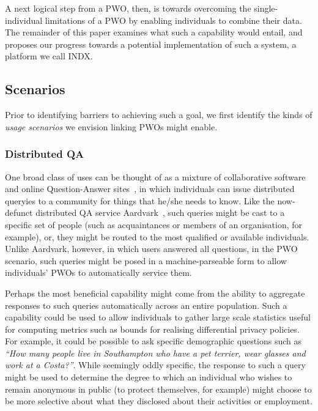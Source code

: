 \documentclass{acm_proc_article-sp}
\begin{document}
A next logical step from a PWO, then, is towards overcoming the single-individual limitations of a PWO by enabling individuals to combine their data.  The remainder of this paper examines what such a capability would entail, and proposes our progress towards a potential implementation of such a system, a platform we call INDX. 

\subsection{Scenarios}

Prior to identifying barriers to achieving such a goal, we first identify the kinds of \emph{usage scenarios} we envision linking PWOs might enable.  

\subsubsection{Distributed QA}

One broad class of uses can be thought of as a mixture of collaborative software and online Question-Answer sites~\cite{harper2009facts}, in which individuals can issue distributed queryies to a community for things that he/she needs to know.  Like the now-defunct distributed QA service Aardvark~\cite{horowitz2010anatomy}, such queries might be cast to a specific set of people (such as acquaintances or members of an organisation, for example), or, they might be routed to the most qualified or available individuals.  Unlike Aardvark, however, in which users answered all questions, in the PWO scenario, such queries might be posed in a machine-parseable form to allow individuals' PWOs to automatically service them.

Perhaps the most beneficial capability might come from the ability to aggregate responses to such queries automatically across an entire population.  Such a capability could be used to allow individuals to gather large scale statistics useful for computing metrics such as bounds for realising differential privacy \cite{dwork2006differential} policies.  For example, it could be possible to ask specific demographic questions such as \emph{``How many people live in Southampton who have a pet terrier, wear glasses and work at a Costa?''}.  While seemingly oddly specific, the response to such a query might be used to determine the degree to which an individual who wishes to remain anonymous in public (to protect themselves, for example) might choose to be more selective about what they disclosed about their activities or employment.
\end{document}
